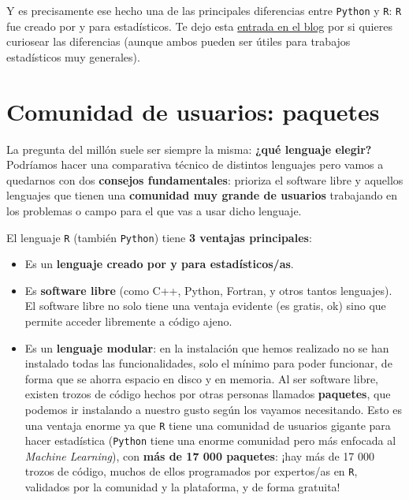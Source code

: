 \documentclass[11pt,]{book}
\begin{document}
Y es precisamente ese hecho una de las principales diferencias entre \texttt{Python} y \texttt{R}: \texttt{R} fue creado por y para estadísticos. Te dejo esta \href{https://dadosdelaplace.github.io/202112_R-python/}{entrada en el blog} por si quieres curiosear las diferencias (aunque ambos pueden ser útiles para trabajos estadísticos muy generales).

\hypertarget{instalacionpaquetes}{%
\section{Comunidad de usuarios: paquetes}\label{instalacionpaquetes}}

La pregunta del millón suele ser siempre la misma: \textbf{¿qué lenguaje elegir?} Podríamos hacer una comparativa técnico de distintos lenguajes pero vamos a quedarnos con dos \textbf{consejos fundamentales}: prioriza el software libre y aquellos lenguajes que tienen una \textbf{comunidad muy grande de usuarios} trabajando en los problemas o campo para el que vas a usar dicho lenguaje.

El lenguaje \texttt{R} (también \texttt{Python}) tiene \textbf{3 ventajas principales}:

\begin{itemize}
\item
  Es un \textbf{lenguaje creado por y para estadísticos/as}.
\item
  Es \textbf{software libre} (como C++, Python, Fortran, y otros tantos lenguajes). El software libre no solo tiene una ventaja evidente (es gratis, ok) sino que permite acceder libremente a código ajeno.
\item
  Es un \textbf{lenguaje modular}: en la instalación que hemos realizado no se han instalado todas las funcionalidades, solo el mínimo para poder funcionar, de forma que se ahorra espacio en disco y en memoria. Al ser software libre, existen trozos de código hechos por otras personas llamados \textbf{paquetes}, que podemos ir instalando a nuestro gusto según los vayamos necesitando. Esto es una ventaja enorme ya que \texttt{R} tiene una comunidad de usuarios gigante para hacer estadística (\texttt{Python} tiene una enorme comunidad pero más enfocada al \emph{Machine Learning}), con \textbf{más de 17 000 paquetes}: ¡hay más de 17 000 trozos de código, muchos de ellos programados por expertos/as en \texttt{R}, validados por la comunidad y la plataforma, y de forma gratuita!
\end{itemize}
\end{document}
